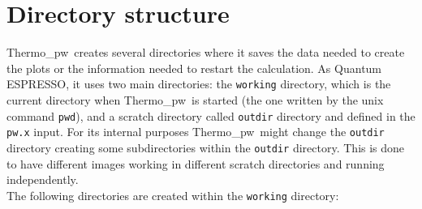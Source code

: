 \documentclass[12pt,a4paper,twoside]{report}
\def\qe{{\sc Quantum ESPRESSO}}
\def\tpw{{\sc Thermo}\_{\sc pw}}
\begin{document}
\newpage
{\color{dark-blue}\chapter{Directory structure}}
\color{black}
\tpw\ creates several directories where it saves the data needed to
create the plots or the information needed to restart the calculation.  
As \qe, it uses two main directories: the \texttt{working} 
directory, which is the current directory when \tpw\ is started 
(the one written by the unix command \texttt{pwd}), and a scratch directory 
called \texttt{outdir} directory and defined in the \texttt{pw.x} input. For its
internal purposes \tpw\ might change the \texttt{outdir} directory creating
some subdirectories within the \texttt{outdir} directory. This is done to
have different images working in different scratch directories and running
independently. \\
The following directories are created within the \texttt{working} directory:
\end{document}
